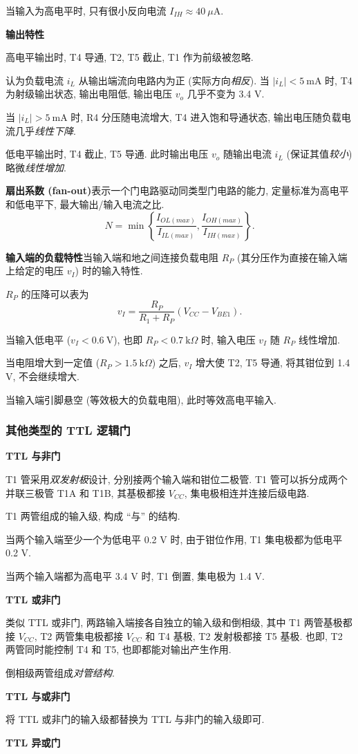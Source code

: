 当输入为高电平时, 只有很小反向电流 $I_{IH}\approx 40\ \mu\text{A}$.

\textbf{输出特性}

高电平输出时, T4 导通, T2, T5 截止, T1 作为前级被忽略.

认为负载电流 $i_L$ 从输出端流向电路内为正 (实际方向\textit{相反}). 当 $|i_L|<5\ \text{mA}$ 时, T4 为射级输出状态, 输出电阻低, 输出电压 $v_o$ 几乎不变为 3.4 V.

当 $|i_L|>5\ \text{mA}$ 时, R4 分压随电流增大, T4 进入饱和导通状态, 输出电压随负载电流几乎\textit{线性下降}.

低电平输出时, T4 截止, T5 导通. 此时输出电压 $v_o$ 随输出电流 $i_L$ (保证其值\textit{较小}) 略微\textit{线性增加}.

\textbf{扇出系数 (fan-out)}\quad 表示一个门电路驱动同类型门电路的能力, 定量标准为高电平和低电平下, 最大输出/输入电流之比.
\begin{equation}
    N=\min\left\{\frac{I_{OL(max)}}{I_{IL(max)}}, \frac{I_{OH(max)}}{I_{IH(max)}}\right\}.
\end{equation}

\textbf{输入端的负载特性}\quad 当输入端和地之间连接负载电阻 $R_P$ (其分压作为直接在输入端上给定的电压 $v_I$) 时的输入特性.

$R_P$ 的压降可以表为
\begin{equation}
    v_I=\frac{R_P}{R_1+R_P}(V_{CC}-V_{BE1}).
\end{equation}

当输入低电平 ($v_I<0.6\ \text{V}$), 也即 $R_P<0.7\ \text{k}\Omega$ 时, 输入电压 $v_I$ 随 $R_P$ 线性增加.

当电阻增大到一定值 ($R_P>1.5\ \text{k}\Omega$) 之后, $v_I$ 增大使 T2, T5 导通, 将其钳位到 1.4 V, 不会继续增大.

当输入端引脚悬空 (等效极大的负载电阻), 此时等效高电平输入.

\subsubsection{其他类型的 TTL 逻辑门}
\textbf{TTL 与非门}

T1 管采用\textit{双发射极}设计, 分别接两个输入端和钳位二极管. T1 管可以拆分成两个并联三极管 T1A 和 T1B, 其基极都接 $V_{CC}$, 集电极相连并连接后级电路.

T1 两管组成的输入级, 构成 ``与'' 的结构.

当两个输入端至少一个为低电平 0.2 V 时, 由于钳位作用, T1 集电极都为低电平 0.2 V.

当两个输入端都为高电平 3.4 V 时, T1 倒置, 集电极为 1.4 V.

\textbf{TTL 或非门}

类似 TTL 或非门, 两路输入端接各自独立的输入级和倒相级, 其中 T1 两管基极都接 $V_{CC}$, T2 两管集电极都接 $V_{CC}$ 和 T4 基极, T2 发射极都接 T5 基极. 也即, T2 两管同时能控制 T4 和 T5, 也即都能对输出产生作用.

倒相级两管组成\textit{对管结构}.

\textbf{TTL 与或非门}

将 TTL 或非门的输入级都替换为 TTL 与非门的输入级即可.

\textbf{TTL 异或门}


